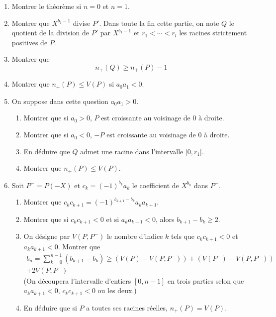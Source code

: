 \begin{enumerate}
    \item Montrer le th{\'e}or{\`e}me si $n=0$ et $n=1$.

    \item Montrer que $X^{b_1-1}$ divise $P'$. Dans toute la fin cette partie, on note $Q$ le quotient de la division de $P'$ par $X^{b_1-1}$ et $r_1 <\cdots < r_l$ les racines strictement positives de $P$.

    \item Montrer que
    \[n_+(Q)\geq n_+(P)-1\]

    \item Montrer que $n_+(P)\leq V(P)$ si $a_0 a_1 <0$.

    \item On suppose dans cette question $a_0 a_1 > 0$.
        \begin{enumerate}
            \item Montrer que si $a_0>0$, $P$ est croissante au voisinage de $0$ {\`a} droite.

            \item Montrer que si $a_0<0$, $-P$ est croissante au voisinage de $0$ {\`a} droite.

            \item En d{\'e}duire que $Q$ admet une racine dans l'intervalle $]0,r_1[$.

            \item Montrer que $n_+(P)\leq V(P)$.
        \end{enumerate}

    \item Soit $P^-=P(-X)$ et $c_k=(-1)^{b_k} a_k$ le coefficient de $X^{b_k}$ dans $P^-$.
        \begin{enumerate}
            \item Montrer que $c_k c_{k+1}=(-1)^{b_{k+1}-b_k} a_ka_{k+1}$.

            \item Montrer que si $c_k c_{k+1}<0$ et si $a_ka_{k+1}<0$, alors $b_{k+1}-b_k \geq 2$.

            \item On d{\'e}signe par $V(P,P^-)$ le nombre d'indice $k$ tels que $c_k c_{k+1}<0$ et $a_k a_{k+1}<0$. Montrer que
\begin{multline*}
b_n = \sum_{k=0}^{n-1} (b_{k+1}-b_k) \geq (V(P)-V(P,P^-)) + (V(P^-)-V(P,P^-))\\+ 2V(P,P^-)  
\end{multline*}
(On d{\'e}coupera l'intervalle d'entiers $[0,n-1]$ en trois parties selon que $a_k a_{k+1}<0$, $c_k c_{k+1}<0$ ou les deux.)

            \item En d{\'e}duire que si $P$ a toutes ses racines r{\'e}elles, $n_+(P)=V(P)$.
        \end{enumerate}
\end{enumerate}


